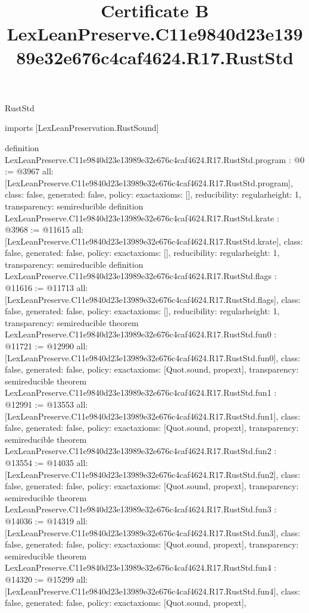 \begin{lexlean}{RustStd}
\title{Certificate B LexLeanPreserve.C11e9840d23e13989e32e676c4caf4624.R17.RustStd}
\begin{coremodule}
imports [LexLeanPreservation.RustSound]

definition LexLeanPreserve.C11e9840d23e13989e32e676c4caf4624.R17.RustStd.program : @0 := @3967 {
  all: [LexLeanPreserve.C11e9840d23e13989e32e676c4caf4624.R17.RustStd.program],
  class: false,
  generated: false,
  policy: exact{axioms: []},
  reducibility: regular{height: 1},
  transparency: semireducible
}
definition LexLeanPreserve.C11e9840d23e13989e32e676c4caf4624.R17.RustStd.krate : @3968 := @11615 {
  all: [LexLeanPreserve.C11e9840d23e13989e32e676c4caf4624.R17.RustStd.krate],
  class: false,
  generated: false,
  policy: exact{axioms: []},
  reducibility: regular{height: 1},
  transparency: semireducible
}
definition LexLeanPreserve.C11e9840d23e13989e32e676c4caf4624.R17.RustStd.flags : @11616 := @11713 {
  all: [LexLeanPreserve.C11e9840d23e13989e32e676c4caf4624.R17.RustStd.flags],
  class: false,
  generated: false,
  policy: exact{axioms: []},
  reducibility: regular{height: 1},
  transparency: semireducible
}
theorem LexLeanPreserve.C11e9840d23e13989e32e676c4caf4624.R17.RustStd.fun0 : @11721 := @12990 {
  all: [LexLeanPreserve.C11e9840d23e13989e32e676c4caf4624.R17.RustStd.fun0],
  class: false,
  generated: false,
  policy: exact{axioms: [Quot.sound, propext]},
  transparency: semireducible
}
theorem LexLeanPreserve.C11e9840d23e13989e32e676c4caf4624.R17.RustStd.fun1 : @12991 := @13553 {
  all: [LexLeanPreserve.C11e9840d23e13989e32e676c4caf4624.R17.RustStd.fun1],
  class: false,
  generated: false,
  policy: exact{axioms: [Quot.sound, propext]},
  transparency: semireducible
}
theorem LexLeanPreserve.C11e9840d23e13989e32e676c4caf4624.R17.RustStd.fun2 : @13554 := @14035 {
  all: [LexLeanPreserve.C11e9840d23e13989e32e676c4caf4624.R17.RustStd.fun2],
  class: false,
  generated: false,
  policy: exact{axioms: [Quot.sound, propext]},
  transparency: semireducible
}
theorem LexLeanPreserve.C11e9840d23e13989e32e676c4caf4624.R17.RustStd.fun3 : @14036 := @14319 {
  all: [LexLeanPreserve.C11e9840d23e13989e32e676c4caf4624.R17.RustStd.fun3],
  class: false,
  generated: false,
  policy: exact{axioms: [Quot.sound, propext]},
  transparency: semireducible
}
theorem LexLeanPreserve.C11e9840d23e13989e32e676c4caf4624.R17.RustStd.fun4 : @14320 := @15299 {
  all: [LexLeanPreserve.C11e9840d23e13989e32e676c4caf4624.R17.RustStd.fun4],
  class: false,
  generated: false,
  policy: exact{axioms: [Quot.sound, propext]},
}
\end{coremodule}
\end{lexlean}
